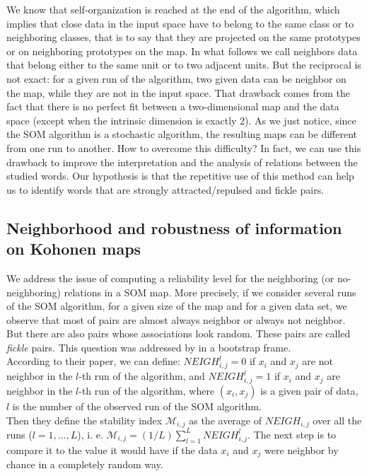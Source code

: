 \documentclass[preprint]{elsarticle}
\begin{document}
We know that self-organization is reached at the end of the algorithm, which implies that close data in the input space have to belong to the same class or to neighboring classes, that is to say that they are projected on the same prototypes or on neighboring prototypes on the map. In what follows we call neighbors data that belong either to the same unit or to two adjacent units. But the reciprocal is not exact: for a given run of the algorithm, two given data can be neighbor on the map, while they are not in the input space. That drawback comes from the fact that there is no perfect fit between a two-dimensional map and the data space (except when the intrinsic dimension is exactly 2). As we just notice, since the SOM algorithm is a stochastic algorithm, the resulting maps can be different from one run to another. How to overcome this difficulty? In fact, we can use this drawback to improve the interpretation and the analysis of relations between the studied words. Our hypothesis is that the repetitive use of this method can help us to identify words that are strongly attracted/repulsed and fickle pairs.

\subsection{Neighborhood and robustness of information on Kohonen maps}

We address the issue of computing a reliability level for the neighboring (or no-neighboring) relations in a SOM map. More precisely, if we consider several runs of the SOM algorithm, for a given size of the map and for a given data set, we observe that most of pairs are almost always neighbor or always not neighbor. But there are also pairs whose associations look random. These pairs are called \textit{fickle} pairs. This question was addressed by \cite{debodt02} in a bootstrap frame.\\

According to their paper, we can define:
$NEIGH_{i,j}^l=0$ if $x_i$ and $x_j$ are not neighbor in the $l$-th run of the algorithm, and 
$NEIGH_{i,j}^l=1$ if $x_i$ and $x_j$ are neighbor in the $l$-th run of the algorithm, 
where $(x_i, x_j)$ is a given pair of data, $l$ is the number of the observed run of the SOM algorithm.\\

Then they define the stability index $\mathcal{M}_{i,j}$ as the average of $NEIGH_{i,j}$ over all the runs ($l=1, \hdots, L$), i. e. 
$\mathcal{M}_{i,j} = (1/L)\sum_{l=1}^L NEIGH_{i,j}^l$. The next step is to compare it to the value it would have if the data $x_i$ and $x_j$ were neighbor by chance in a completely random way.\\
\end{document}
